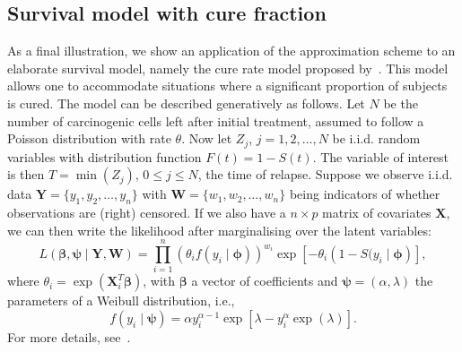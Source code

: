 \documentclass[a4paper, notitlepage, 11pt]{article}
\begin{document}
\subsection{Survival model with cure fraction}
\label{sec:survival}

As a final illustration, we show an application of the approximation scheme to an elaborate survival model, namely the cure rate model proposed by~\cite{Chen1999a}.
This model allows one to accommodate situations where a significant proportion of subjects is cured.
The model can be described generatively as follows.
Let $N$ be the number of carcinogenic cells left after initial treatment, assumed to follow a Poisson distribution with rate $\theta$.
Now let $Z_j$, $j = 1, 2, \ldots, N$ be i.i.d. random variables with distribution function $F(t) = 1 - S(t)$.
The variable of interest is then $T = \min(Z_j)$, $0 \leq j \leq N$, the time of relapse.
Suppose we observe i.i.d. data $\boldsymbol Y = \{ y_1, y_2, \ldots, y_n \}$ with $\boldsymbol W = \{ w_1, w_2, \ldots, w_n\}$ being indicators of whether observations are (right) censored.
If we also have a $n \times p$ matrix of covariates $\boldsymbol X$, we can then write the likelihood after marginalising over the latent variables:
\begin{equation}
\label{eq:cure_rate_likelihood}
L(\boldsymbol\beta, \boldsymbol \psi \mid \boldsymbol Y, \boldsymbol W) = \prod_{i = 1}^n \left(\theta_i f(y_i \mid \boldsymbol\phi) \right)^{w_i} \exp\left[ -\theta_i \left( 1- S(y_i \mid \boldsymbol\phi \right) \right],
\end{equation}
where $\theta_i = \exp(\boldsymbol X_i^T\boldsymbol\beta)$, with $\boldsymbol \beta$ a vector of coefficients and $\boldsymbol \psi = (\alpha, \lambda) $ the parameters of a Weibull distribution, i.e.,
$$ f(y_i \mid \boldsymbol \psi) = \alpha y_i^{\alpha -1} \exp\left[ \lambda - y_i^\alpha \exp(\lambda)\right].$$
For more details, see~\cite{Chen1999a}.
\end{document}
